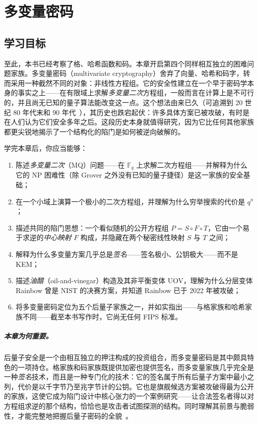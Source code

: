 \chapter{多变量密码}
\label{ch:multivariate}

\section{学习目标}

至此，本书已经考察了格、哈希函数和码。本章开启第四个同样相互独立的困难问题家族。多变量密码（multivariate cryptography）舍弃了向量、哈希和码字，转而采用一种截然不同的对象：非线性方程组。它的安全性建立在一个早于密码学本身的事实之上——在有限域上求解\emph{多变量二次}方程组，一般而言在计算上是不可行的，并且尚无已知的量子算法能改变这一点。这个想法由来已久（可追溯到 20 世纪 80 年代末和 90 年代~\cite{ding2006}），其历史也跌宕起伏：许多具体方案已被攻破，有时是在人们认为它们安全多年之后。这段历史本身就值得研究，因为它比任何其他家族都更尖锐地揭示了一个结构化的陷门是如何被逆向破解的。

学完本章后，你应当能够：

\begin{enumerate}
  \item 陈述\emph{多变量二次}（MQ）问题——在 $\mathbb{F}_q$ 上求解二次方程组——并解释为什么它的 NP 困难性（除 Grover 之外没有已知的量子捷径）是这一家族的安全基础；
  \item 在一个小域上演算一个极小的二次方程组，并理解为什么穷举搜索的代价是 $q^n$；
  \item 描述共同的陷门思想：一个看似随机的公开方程组 $P = S \circ F \circ T$，它由一个易于求逆的\emph{中心映射} $F$ 构成，并隐藏在两个秘密线性映射 $S$ 与 $T$ 之间；
  \item 解释为什么多变量方案几乎总是\emph{签名}——签名极小、公钥极大——而不是 KEM；
  \item 描述\emph{油醋}（oil-and-vinegar）构造及其非平衡变体 UOV，理解为什么分层变体 Rainbow 曾是 NIST 的决赛方案，并知道 Rainbow 已于 2022 年被攻破；
  \item 将多变量密码定位为五个后量子家族之一，并如实指出——与格家族和哈希家族不同——截至本书写作时，它尚无任何 FIPS 标准。
\end{enumerate}

\paragraph{本章为何重要。}
后量子安全是一个由相互独立的押注构成的投资组合，而多变量密码是其中颇具特色的一项持仓。格家族和码家族既提供加密也提供签名，而多变量家族几乎完全是一种\emph{签名}技术，而且是一种专门化的技术：它的签名属于所有后量子方案中最小之列，代价是以千字节乃至兆字节计的公钥。它也是旗舰候选方案被攻破得最为公开的家族，这使它成为陷门设计中核心张力的一个案例研究——让合法签名者得以对方程组求逆的那个结构，恰恰也是攻击者试图探测的结构。同时理解其前景与脆弱性，才能完整地把握后量子密码的全貌~\cite{bernstein2009}。

